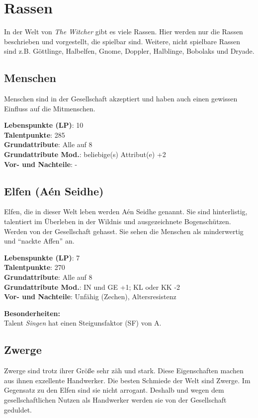 {\let\clearpage\relax\chapter{Rassen}}
In der Welt von \textit{The Witcher} gibt es viele Rassen. Hier werden nur die Rassen beschrieben und vorgestellt, die spielbar sind. Weitere, nicht spielbare Rassen sind z.B. Göttlinge, Halbelfen, Gnome, Doppler, Halblinge, Bobolaks und Dryade.

\section{Menschen}
Menschen sind in der Gesellschaft akzeptiert und haben auch einen gewissen Einfluss auf die Mitmenschen.

\textbf{Lebenspunkte (LP)}: 10 \\
\textbf{Talentpunkte}: 285 \\
\textbf{Grundattribute}: Alle auf 8 \\
\textbf{Grundattribute Mod.}: beliebige(s) Attribut(e) +2  \\
\textbf{Vor- und Nachteile}: - 

\section{Elfen (Aén Seidhe)}
Elfen, die in dieser Welt leben werden Aén Seidhe genannt. Sie sind hinterlistig, talentiert im Überleben in der Wildnis und ausgezeichnete Bogenschützen. Werden von der Gesellschaft gehasst. Sie sehen die Menschen als minderwertig und "`nackte Affen"' an.

\textbf{Lebenspunkte (LP)}: 7 \\
\textbf{Talentpunkte}: 270 \\
\textbf{Grundattribute}: Alle auf 8 \\
\textbf{Grundattribute Mod.}: IN und GE +1; KL oder KK -2 \\
\textbf{Vor- und Nachteile}: Unfähig (Zechen), Altersresistenz

\textbf{Besonderheiten:} \\
Talent \textit{Singen} hat einen Steigunsfaktor (SF) von A.

\section{Zwerge}
Zwerge sind trotz ihrer Größe sehr zäh und stark. Diese Eigenschaften machen aus ihnen exzellente Handwerker. Die besten Schmiede der Welt sind Zwerge. Im Gegensatz zu den Elfen sind sie nicht arrogant. Deshalb und wegen dem gesellschaftlichen Nutzen als Handwerker werden sie von der Gesellschaft geduldet.

